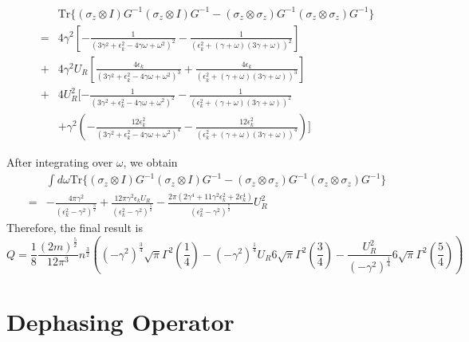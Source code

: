 \documentclass{article}
\begin{document}
\begin{align}
 & \mathrm{Tr}\{(\sigma_{z}\otimes I)G^{-1}(\sigma_{z}\otimes I)G^{-1}-(\sigma_{z}\otimes\sigma_{z})G^{-1}(\sigma_{z}\otimes\sigma_{z})G^{-1}\}\nonumber \\
= & 4\gamma^{2}[-\frac{1}{(3\gamma^{2}+\epsilon_{k}^{2}-4\gamma\omega+\omega^{2})^{2}}-\frac{1}{(\epsilon_{k}^{2}+(\gamma+\omega)(3\gamma+\omega))^{2}}]\nonumber \\
+ & 4\gamma^{2}U_{R}[\frac{4\epsilon_{k}}{(3\gamma^{2}+\epsilon_{k}^{2}-4\gamma\omega+\omega^{2})^{3}}+\frac{4\epsilon_{k}}{(\epsilon_{k}^{2}+(\gamma+\omega)(3\gamma+\omega))^{3}}]\nonumber \\
+ & 4U_{R}^{2}[-\frac{1}{(3\gamma^{2}+\epsilon_{k}^{2}-4\gamma\omega+\omega^{2})^{2}}-\frac{1}{(\epsilon_{k}^{2}+(\gamma+\omega)(3\gamma+\omega))^{2}}\nonumber \\
 & +\gamma^{2}(-\frac{12\epsilon_{k}^{2}}{(3\gamma^{2}+\epsilon_{k}^{2}-4\gamma\omega+\omega^{2})^{4}}-\frac{12\epsilon_{k}^{2}}{(\epsilon_{k}^{2}+(\gamma+\omega)(3\gamma+\omega))^{4}})]
\end{align}

After integrating over $\omega$, we obtain 
\begin{align}
 & \int d\omega\mathrm{Tr}\{(\sigma_{z}\otimes I)G^{-1}(\sigma_{z}\otimes I)G^{-1}-(\sigma_{z}\otimes\sigma_{z})G^{-1}(\sigma_{z}\otimes\sigma_{z})G^{-1}\}\nonumber \\
= & -\frac{4\pi\gamma^{2}}{(\epsilon_{k}^{2}-\gamma^{2})^{\frac{3}{2}}}+\frac{12\pi\gamma^{2}\epsilon_{k}U_{R}}{(\epsilon_{k}^{2}-\gamma^{2})^{\frac{5}{2}}}-\frac{2\pi(2\gamma^{4}+11\gamma^{2}\epsilon_{k}^{2}+2\epsilon_{k}^{4})}{(\epsilon_{k}^{2}-\gamma^{2})^{\frac{7}{2}}}U_{R}^{2}
\end{align}
Therefore, the final result is 
\begin{equation}
Q=\frac{1}{8}\frac{(2m)^{\frac{5}{2}}}{12\pi^{3}}n^{\frac{3}{2}}\left((-\gamma^{2})^{\frac{3}{4}}\sqrt{\pi}\Gamma^{2}(\frac{1}{4})-(-\gamma^{2})^{\frac{1}{4}}U_{R}6\sqrt{\pi}\Gamma^{2}(\frac{3}{4})-\frac{U_{R}^{2}}{(-\gamma^{2})^{\frac{1}{4}}}6\sqrt{\pi}\Gamma^{2}(\frac{5}{4})\right)
\end{equation}

\section{Dephasing Operator}
\end{document}
